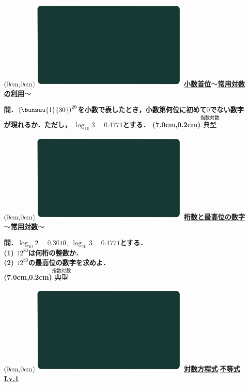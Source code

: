\documentclass[10pt,
fleqn,
dvipdfmx,
uplatex
]{jsarticle}
\begin{document}
\at(0cm,0cm){\includegraphics[width=8cm,bb=0 0 1920 1080]{./youtube/thumbnails/templates/smart_background/指数対数.jpeg}}
{\color{orange}\bf\boldmath\Large\underline{小数首位$〜$常用対数の利用$〜$}}\vspace{0.3zw}

\Large 
\bf\boldmath 問．$\left(\bunsuu{1}{{}30}\right)^{20}$を小数で表したとき，小数第何位に初めて$0$でない数字が現れるか．ただし，
$\log _{10}3=0.{4771}$とする．
\at(7.0cm,0.2cm){\small\color{bradorange}$\overset{\text{指数対数}}{\text{典型}}$}


\newpage



\at(0cm,0cm){\includegraphics[width=8cm,bb=0 0 1920 1080]{./youtube/thumbnails/templates/smart_background/指数対数.jpeg}}
{\color{orange}\bf\boldmath\large\underline{桁数と最高位の数字$〜$常用対数$〜$}}\vspace{0.3zw}

\Large 
\bf\boldmath 問．$\log _{10}2=0.{3010},\;\log _{10}3=0.{4771}$とする．\\
(1)  ${12}^{80}$は何桁の整数か．\\
(2)  ${12}^{80}$の最高位の数字を求めよ．\\

\at(7.0cm,0.2cm){\small\color{bradorange}$\overset{\text{指数対数}}{\text{典型}}$}


\newpage



\at(0cm,0cm){\includegraphics[width=8cm,bb=0 0 1920 1080]{./youtube/thumbnails/templates/smart_background/指数対数.jpeg}}
{\color{orange}\bf\boldmath\Large\underline{対数方程式$\cdot$不等式 Lv.1 }}\vspace{0.3zw}
\end{document}

